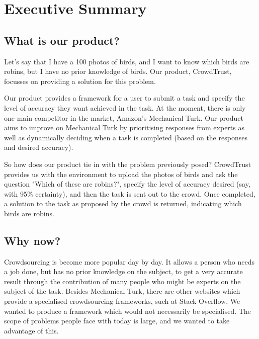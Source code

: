 \documentclass[11pt]{article}
\begin{document}
\newpage

\tableofcontents	%

\newpage


\section{Executive Summary}

\subsection{What is our product?}
Let's say that I have a 100 photos of birds, and I want to know which birds are 
robins, but I have no prior knowledge of birds. Our product, CrowdTrust, focusses
on providing a solution for this problem.

Our product provides a framework for a user to submit a task and specify
the level of accuracy they want achieved in the task. At the moment,
there is only one main competitor in the market, Amazon's Mechanical
Turk. Our product aims to improve on Mechanical Turk by prioritising responses
from experts as well as dynamically deciding when a task is completed (based
on the responses and desired accuracy).

So how does our product tie in with the problem previously posed? CrowdTrust
provides us with the environment to upload the photos of birds and ask the question
"Which of these are 
robins?", specify the level of accuracy desired (say, with 95\% certainty), and then 
the task is sent out to the crowd. Once completed, a solution to the 
task as proposed by the crowd is returned, indicating which birds are robins.

\subsection{Why now?}
Crowdsourcing is become more popular day by day. It allows a person who needs
a job done, but has no prior knowledge on the subject, to get a very accurate
result through the contribution of many people who might be experts on the
subject of the task. Besides Mechanical Turk, there are other websites which
provide a specialised crowdsourcing frameworks, such at Stack Overflow. We wanted
to produce a framework which would not necessarily be specialised. The scope of
problems people face with today is large, and we wanted to take advantage of this.
\end{document}
